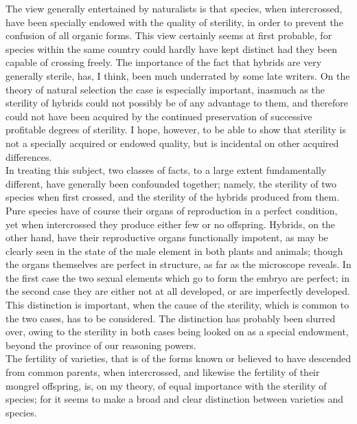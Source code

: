 \indent The view generally entertained by naturalists is that species, when intercrossed, have been specially endowed with the quality of sterility, in order to prevent the confusion of all organic forms. This view certainly seems at first probable, for species within the same country could hardly have kept distinct had they been capable of crossing freely. The importance of the fact that hybrids are very generally sterile, has, I think, been much underrated by some late writers. On the theory of natural selection the case is especially important, inasmuch as the sterility of hybrids could not possibly be of any advantage to them, and therefore could not have been acquired by the continued preservation of successive profitable degrees of sterility. I hope, however, to be able to show that sterility is not a specially acquired or endowed quality, but is incidental on other acquired differences.\\
\indent In treating this subject, two classes of facts, to a large extent fundamentally different, have generally been confounded together; namely, the sterility of two species when first crossed, and the sterility of the hybrids produced from them.\\
\indent Pure species have of course their organs of reproduction in a perfect condition, yet when intercrossed they produce either few or no offspring. Hybrids, on the other hand, have their reproductive organs functionally impotent, as may be clearly seen in the state of the male element in both plants and animals; though the organs themselves are perfect in structure, as far as the microscope reveals. In the first case the two sexual elements which go to form the embryo are perfect; in the second case they are either not at all developed, or are imperfectly developed. This distinction is important, when the cause of the sterility, which is common to the two cases, has to be considered. The distinction has probably been slurred over, owing to the sterility in both cases being looked on as a special endowment, beyond the province of our reasoning powers.\\
\indent The fertility of varieties, that is of the forms known or believed to have descended from common parents, when intercrossed, and likewise the fertility of their mongrel offspring, is, on my theory, of equal importance with the sterility of species; for it seems to make a broad and clear distinction between varieties and species.\\
